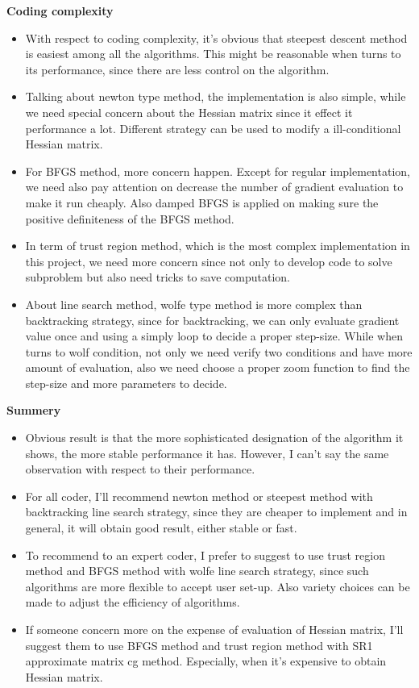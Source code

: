 \documentclass[11pt]{report}
\begin{document}
\begin{center}
    \textbf{Coding complexity}
    \begin{itemize}
        \item With respect to coding complexity, it's obvious that steepest descent method is easiest among all the algorithms. This might be reasonable when turns to its performance, since there are less control on the algorithm.
        \item Talking about newton type method, the implementation is also simple, while we need special concern about the Hessian matrix since it effect it performance a lot. Different strategy can be used to modify a ill-conditional Hessian matrix.
        \item For BFGS method, more concern happen. Except for regular implementation, we need also pay attention on decrease the number of gradient evaluation to make it run cheaply. Also damped BFGS is applied on making sure the positive definiteness of the BFGS method.
        \item In term of trust region method, which is the most complex implementation in this project, we need more concern since not only to develop code to solve subproblem but also need tricks to save computation. 
        \item About line search method, wolfe type method is more complex than backtracking strategy, since for backtracking, we can only evaluate gradient value once and using a simply loop to decide a proper step-size. While when turns to wolf condition, not only we need verify two conditions and have more amount of evaluation, also we need choose a proper zoom function to find the step-size and more parameters to decide.
    \end{itemize}
\end{center}

\begin{center}
    \textbf{Summery}
    \begin{itemize}
        \item Obvious result is that the more sophisticated designation of the algorithm it shows, the more stable performance it has. However, I can't say the same observation with respect to their performance. 
        \item For all coder, I'll recommend newton method or steepest method with backtracking line search strategy, since they are cheaper to implement and in general, it will obtain good result, either stable or fast.
        \item To recommend to an expert coder, I prefer to suggest to use trust region method and BFGS method with wolfe line search strategy, since such algorithms are more flexible to accept user set-up. Also variety choices can be made to adjust the efficiency of algorithms.
        \item If someone concern more on the expense of evaluation of Hessian matrix, I'll suggest them to use BFGS method and trust region method with SR1 approximate matrix cg method. Especially, when it's expensive to obtain Hessian matrix.
    \end{itemize}
\end{center}
\end{document}
